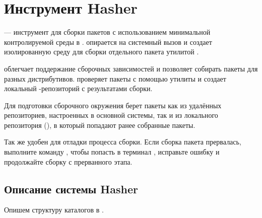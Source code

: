 \chapter{Инструмент Hasher}\label{chapter-hasher}
 --- инструмент для сборки пакетов с использованием минимальной контролируемой среды в .  опирается на системный вызов  и создает изолированную среду для сборки отдельного пакета утилитой .

 облегчает поддержание сборочных зависимостей и позволяет собирать пакеты для разных дистрибутивов.  проверяет пакеты с помощью утилиты  и создает локальный -репозиторий с результатами сборки.

Для подготовки сборочного окружения  берет пакеты как из удалённых репозиториев, настроенных в основной системы, так и из локального репозитория (), в который попадают ранее собранные пакеты.

Так же  удобен для отладки процесса сборки. Если сборка пакета прервалась, выполните команду , чтобы попасть в терминал , исправьте ошибку и продолжайте сборку с прерванного этапа.


\section{Описание системы Hasher}
Опишем структуру каталогов в .

